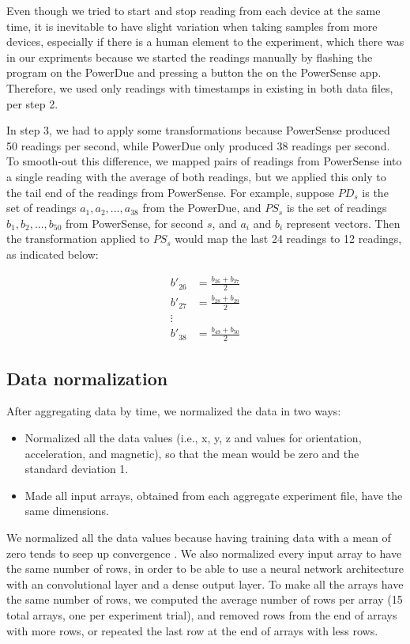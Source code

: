 \documentclass[journal]{IEEEtranTIE}
\begin{document}
Even though we tried to start and stop reading from each device at the same
time, it is inevitable to have slight variation when taking samples from more
devices, especially if there is a human element to the experiment, which there
was in our expriments because we started the readings manually by flashing the
program on the PowerDue and pressing a button the on the PowerSense app.
Therefore, we used only readings with timestamps in existing in both data files,
per step 2.

In step 3, we had to apply some transformations because PowerSense produced 50
readings per second, while PowerDue only produced 38 readings per second. To
smooth-out this difference, we mapped pairs of readings from PowerSense into a
single reading with the average of both readings, but we applied this only to
the tail end of the readings from PowerSense. For example, suppose $PD_s$ is the
set of readings $a_1, a_2, ..., a_{38}$ from the PowerDue, and $PS_s$ is the set
of readings $b_1, b_2, ..., b_{50}$ from PowerSense, for second $s$, and $a_i$
and $b_i$ represent vectors. Then the transformation applied to $PS_s$ would map
the last 24 readings to 12 readings, as indicated below:

\begin{align}
    b'_{26} &= \frac{b_{26} + b_{27}}{2} \\
    b'_{27} &= \frac{b_{28} + b_{29}}{2} \\
    \vdots \\
    b'_{38} &= \frac{b_{49} + b_{50}}{2}
\end{align}

\subsection{Data normalization}

After aggregating data by time, we normalized the data in two ways:

\begin{itemize}
\item Normalized all the data values (i.e., x, y, z and values for orientation,
      acceleration, and magnetic), so that the mean would be zero and the
      standard deviation 1.
\item Made all input arrays, obtained from each aggregate experiment file, have
      the same dimensions.
\end{itemize}

We normalized all the data values because having training data with a mean of
zero tends to seep up convergence \cite{DLTricks}. We also normalized every
input array to have the same number of rows, in order to be able to use a neural
network architecture with an convolutional layer and a dense output layer. To
make all the arrays have the same number of rows, we computed the average number
of rows per array (15 total arrays, one per experiment trial), and removed rows
from the end of arrays with more rows, or repeated the last row at the end of
arrays with less rows.
\end{document}
